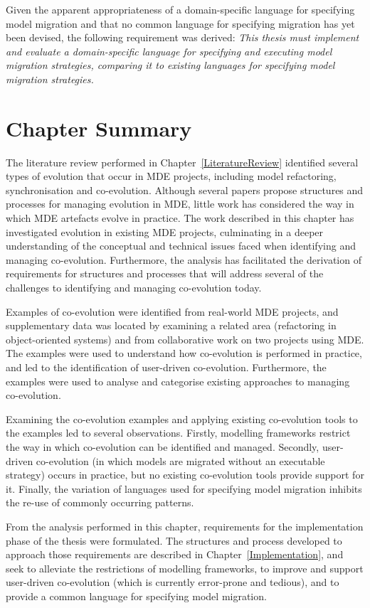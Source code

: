Given the apparent appropriateness of a domain-specific language for specifying model migration and that no common language for specifying migration has yet been devised, the following requirement was derived: \emph{This thesis must implement and evaluate a domain-specific language for specifying and executing model migration strategies, comparing it to existing languages for specifying model migration strategies.}

\section{Chapter Summary}
The literature review performed in Chapter~\ref{LiteratureReview} identified several types of evolution that occur in MDE projects, including model refactoring, synchronisation and co-evolution. Although several papers propose structures and processes for managing evolution in MDE, little work has considered the way in which MDE artefacts evolve in practice. The work described in this chapter has investigated evolution in existing MDE projects, culminating in a deeper understanding of the conceptual and technical issues faced when identifying and managing co-evolution. Furthermore, the analysis has facilitated the derivation of requirements for structures and processes that will address several of the challenges to identifying and managing co-evolution today.

Examples of co-evolution were identified from real-world MDE projects, and supplementary data was located by examining a related area (refactoring in object-oriented systems) and from collaborative work on two projects using MDE. The examples were used to understand how co-evolution is performed in practice, and led to the identification of user-driven co-evolution. Furthermore, the examples were used to analyse and categorise existing approaches to managing co-evolution.

Examining the co-evolution examples and applying existing co-evolution tools to the examples led to several observations. Firstly, modelling frameworks restrict the way in which co-evolution can be identified and managed. Secondly, user-driven co-evolution (in which models are migrated without an executable strategy) occurs in practice, but no existing co-evolution tools provide support for it. Finally, the variation of languages used for specifying model migration inhibits the re-use of commonly occurring patterns.

From the analysis performed in this chapter, requirements for the implementation phase of the thesis were formulated. The structures and process developed to approach those requirements are described in Chapter~\ref{Implementation}, and seek to alleviate the restrictions of modelling frameworks, to improve and support user-driven co-evolution (which is currently error-prone and tedious), and to provide a common language for specifying model migration.

